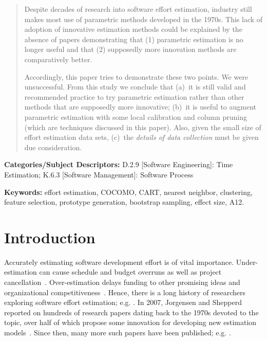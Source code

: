 \documentclass{sig-alternate}
\begin{document}
\begin{abstract}
Despite decades of research into software effort estimation,
 industry  still makes most use of 
parametric methods  developed in the 1970s.
This  lack of adoption of   innovative  estimation methods
could be explained by the absence of papers demonstrating that
(1) parametric estimation is no longer useful and that
(2) supposedly more innovation methods 
are comparatively better. 

Accordingly, this paper tries 
to demonstrate these two points. We were unsuccessful. 
From this study we conclude that (a)~it is still valid and recommended practice to try parametric estimation
rather than other methods that are supposedly more  innovative;
(b)~it is useful
to augment parametric estimation with some local calibration 
and column pruning (which are techniques  discussed in this paper).
Also, given the small size of effort estimation data sets,
(c)~the {\em details of data collection} must be given due consideration.
\end{abstract}


\vspace{1mm}
\noindent
{\bf Categories/Subject Descriptors:} 
D.2.9 [Software Engineering]: Time Estimation;
K.6.3 [Software Management]: Software Process

\vspace{1mm}
\noindent
{\bf Keywords:} effort estimation, COCOMO, CART, nearest neighbor, 
clustering, feature selection, prototype generation, bootstrap sampling, effect size, A12.
 

\section{Introduction}
Accurately estimating software development
effort  is of vital
importance. 
Under-estimation can cause schedule and budget
overruns as well as project
cancellation~\cite{CLCS03}.  Over-estimation delays
funding to other promising ideas and
organizational competitiveness~\cite{koc11a}.
Hence, there is a long history
of researchers exploring software effort estimation; e.g. \cite{wol74,frei79,putnam76,black77,herd77,watson77,jensen83,park88,boehm81,Walkerden1999,shepperd97,jorgensen05,me06d,burgess01}.
In 2007, Jorgensen and Shepperd
reported on hundreds of research papers dating back to the 1970s devoted to
the topic, over half of which propose some innovation
for developing new estimation
models~\cite{jorgensen05}. Since then,
many more such papers have been published;
e.g. \cite{lokan06,cora10,minku14,Li2007,Li2009a,keung2008a,keung2008b,keung2008c,koc11b,me12a,me13a,kocaguneli2014transfer}.
\end{document}
